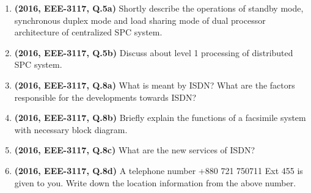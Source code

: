\documentclass[12pt, a4paper]{article}
\begin{document}
\begin{enumerate}
		\item \textbf{(2016, EEE-3117, Q.5a)} Shortly describe the operations of standby mode, synchronous duplex mode and load sharing mode of dual processor architecture of centralized SPC system.
		\item \textbf{(2016, EEE-3117, Q.5b)} Discuss about level 1 processing of distributed SPC system.
		\item \textbf{(2016, EEE-3117, Q.8a)} What is meant by ISDN? What are the factors responsible for the developments towards ISDN?
		\item \textbf{(2016, EEE-3117, Q.8b)} Briefly explain the functions of a facsimile system with necessary block diagram.
		\item \textbf{(2016, EEE-3117, Q.8c)} What are the new services of ISDN?
		\item \textbf{(2016, EEE-3117, Q.8d)} A telephone number +880 721 750711 Ext 455 is given to you. Write down the location information from the above number.
	\end{enumerate}
	
\end{document}
